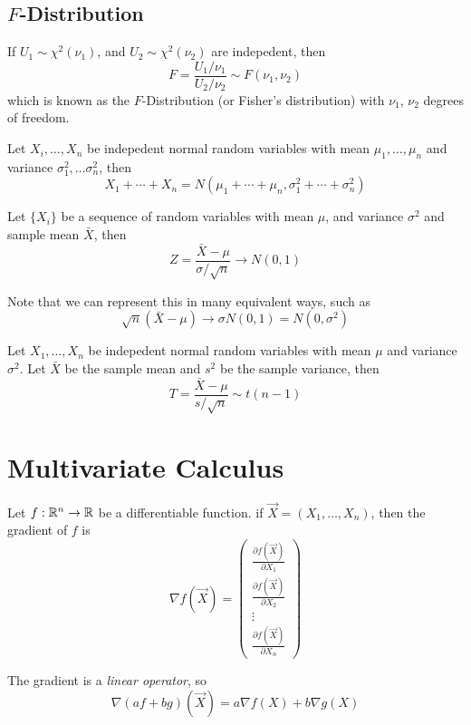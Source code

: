\subsection*{$F$-Distribution}
If $U_1 \sim \chi^2(\nu_1)$, and $U_2 \sim \chi^2(\nu_2)$ are indepedent, then 
\[F = \frac{U_1/\nu_1}{U_2/\nu_2} \sim F(\nu_1, \nu_2)\]
which is known as the $F$-Distribution (or Fisher's distribution) with $\nu_1$, $\nu_2$ degrees of freedom. 
\begin{theorem}
    Let $X_i, \ldots, X_n$ be indepedent normal random variables with mean $\mu_1,\ldots, \mu_n$ and variance $\sigma^2_1, \ldots \sigma^2_n$, then 
    \[X_1 + \cdots + X_n = N(\mu_1 + \cdots + \mu_n, \sigma^2_1 + \cdots + \sigma^2_n)\]
\end{theorem}
\begin{theorem}
    Let $\{X_i\}$ be a sequence of random variables with mean $\mu$, and variance $\sigma^2$ and sample mean $\bar{X}$, then 
    \[Z = \frac{\bar{X} - \mu}{\sigma / \sqrt{n}} \rightarrow N(0,1)\]
\end{theorem}
Note that we can represent this in many equivalent ways, such as 
\[\sqrt{n}(\bar{X} - \mu) \rightarrow \sigma N(0,1) = N(0, \sigma^2)\]
\begin{theorem}
    Let $X_1, \ldots, X_n$ be indepedent normal random variables with mean $\mu$ and variance $\sigma^2$. Let $\bar{X}$ be the sample mean and $s^2$ be the sample variance, then 
    \[T = \frac{\bar{X} - \mu}{s/\sqrt{n}} \sim t(n-1)\]
\end{theorem}

\section{Multivariate Calculus}
\begin{definition}[Gradient]
    Let $f: \mathbb{R}^n \rightarrow \mathbb{R}$ be a differentiable function. if $\vec{X} = (X_1, \ldots, X_n)$, then the gradient of $f$ is 
    \[\nabla f(\vec{X}) = \begin{pmatrix}
        \frac{\partial f(\vec{X})}{\partial X_1 } \\ \frac{\partial f(\vec{X})}{\partial X_2 } \\ \vdots \\ \frac{\partial f(\vec{X})}{\partial X_n }
    \end{pmatrix}\]
\end{definition}
The gradient is a \emph{linear operator}, so 
\[\nabla (af + bg)(\vec{X}) = a\nabla f(X) + b \nabla g(X)\]


